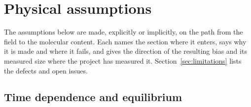 \section{Physical assumptions}
\label{sec:assumptions}

The assumptions below are made, explicitly or implicitly, on the path from
the field to the molecular content. Each names the section where it enters,
says why it is made and where it fails, and gives the direction of the
resulting bias and its measured size where the project has measured it.
Section~\ref{sec:limitations} lists the defects and open issues.

\subsection{Time dependence and equilibrium}
